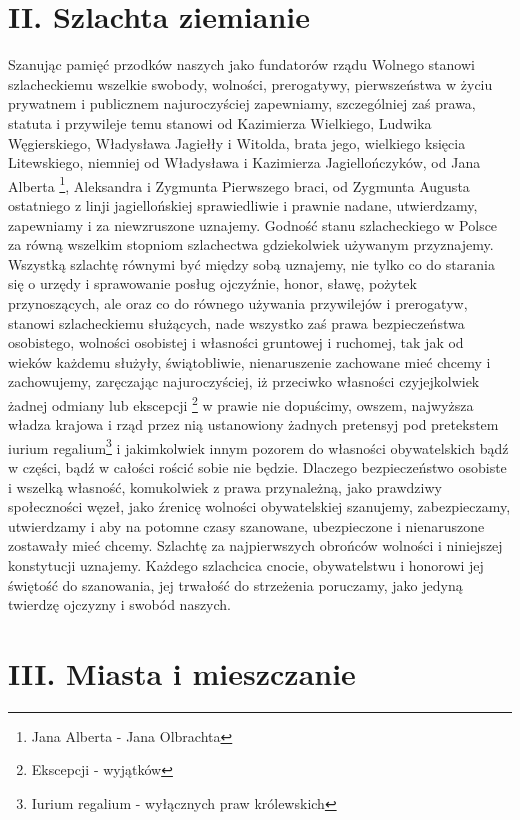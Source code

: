\documentclass{book}
\begin{document}
 
\section*{II. Szlachta ziemianie}

 Szanując pamięć przodków naszych jako fundatorów rządu Wolnego stanowi szlacheckiemu wszelkie swobody, wolności, prerogatywy, pierwszeństwa w życiu prywatnem i publicznem najuroczyściej zapewniamy, szczególniej zaś prawa, statuta i przywileje temu stanowi od Kazimierza Wielkiego, Ludwika Węgierskiego, Władysława Jagiełły i Witolda, brata jego, wielkiego księcia Litewskiego,  niemniej od Władysława i Kazimierza Jagiellończyków, od Jana Alberta \footnote{Jana Alberta - Jana Olbrachta},  Aleksandra i Zygmunta Pierwszego braci, od Zygmunta Augusta ostatniego z linji jagiellońskiej sprawiedliwie i prawnie nadane, utwierdzamy, zapewniamy i za niewzruszone uznajemy.  Godność stanu szlacheckiego w Polsce za równą wszelkim stopniom szlachectwa gdziekolwiek używanym przyznajemy.  Wszystką szlachtę równymi być między sobą uznajemy, nie tylko co do starania się o urzędy i sprawowanie posług ojczyźnie, honor, sławę, pożytek przynoszących,  ale oraz co do równego używania przywilejów i prerogatyw, stanowi szlacheckiemu służących, nade wszystko zaś prawa bezpieczeństwa osobistego, wolności osobistej  i własności gruntowej i ruchomej, tak jak od wieków każdemu służyły, świątobliwie, nienaruszenie zachowane mieć chcemy i zachowujemy,  zaręczając najuroczyściej, iż przeciwko własności czyjejkolwiek żadnej odmiany lub ekscepcji \footnote{Ekscepcji - wyjątków}  w prawie nie dopuścimy, owszem, najwyższa władza krajowa i rząd przez nią ustanowiony żadnych pretensyj pod pretekstem iurium regalium\footnote{Iurium regalium - wyłącznych praw królewskich}  i jakimkolwiek innym pozorem do własności obywatelskich bądź w części, bądź w całości rościć sobie nie będzie.  Dlaczego bezpieczeństwo osobiste i wszelką własność, komukolwiek z prawa przynależną, jako prawdziwy społeczności węzeł, jako źrenicę wolności obywatelskiej szanujemy,  zabezpieczamy, utwierdzamy i aby na potomne czasy szanowane, ubezpieczone i nienaruszone zostawały mieć chcemy.  Szlachtę za najpierwszych obrońców wolności i niniejszej konstytucji uznajemy.  Każdego szlachcica cnocie, obywatelstwu i honorowi jej świętość do szanowania, jej trwałość do strzeżenia poruczamy, jako jedyną twierdzę ojczyzny i swobód naszych. 

 
\section*{III. Miasta i mieszczanie}
\end{document}
